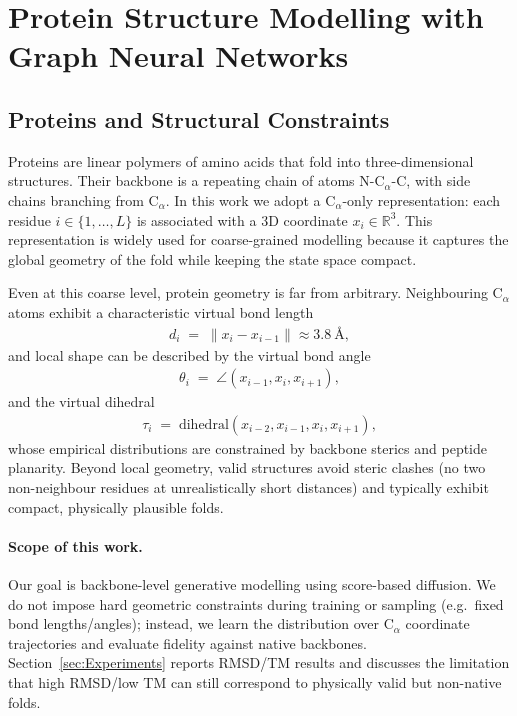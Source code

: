 \documentclass[a4paper,12pt]{article}
\begin{document}
\clearpage

\section{Protein Structure Modelling with Graph Neural Networks}\label{sec:protein-gnn}
\subsection{Proteins and Structural Constraints}\label{subsec:proteins-constraints}
Proteins are linear polymers of amino acids that fold into three-dimensional structures. Their backbone is a repeating chain of atoms N-C\(_\alpha\)-C, with side chains branching from C\(_\alpha\). In this work we adopt a C\(_\alpha\)-only representation: each residue \(i \in \{1,\dots,L\}\) is associated with a 3D coordinate \(x_i \in \mathbb{R}^3\). This representation is widely used for coarse-grained modelling because it captures the global geometry of the fold while keeping the state space compact.

Even at this coarse level, protein geometry is far from arbitrary. Neighbouring C\(_\alpha\) atoms exhibit a characteristic virtual bond length
\begin{align*}
    d_i \;=\; \|x_i - x_{i-1}\| \approx 3.8~\text{\AA},
\end{align*}
and local shape can be described by the virtual bond angle
\begin{align*}
    \theta_i \;=\; \angle(x_{i-1}, x_i, x_{i+1}),
\end{align*}
and the virtual dihedral
\begin{align*}
    \tau_i \;=\; \mathrm{dihedral}(x_{i-2}, x_{i-1}, x_i, x_{i+1}),
\end{align*}
whose empirical distributions are constrained by backbone sterics and peptide planarity. 
Beyond local geometry, valid structures avoid steric clashes (no two non-neighbour residues at unrealistically short distances) and typically exhibit compact, physically plausible folds. 

\paragraph{Scope of this work.}
Our goal is backbone-level generative modelling using score-based diffusion. We do not impose hard geometric constraints during training or sampling (e.g.\ fixed bond lengths/angles); instead, we learn the distribution over C\(_\alpha\) coordinate trajectories and evaluate fidelity against native backbones. Section~\ref{sec:Experiments} reports RMSD/TM results and discusses the limitation that high RMSD/low TM can still correspond to physically valid but non-native folds.
\end{document}
